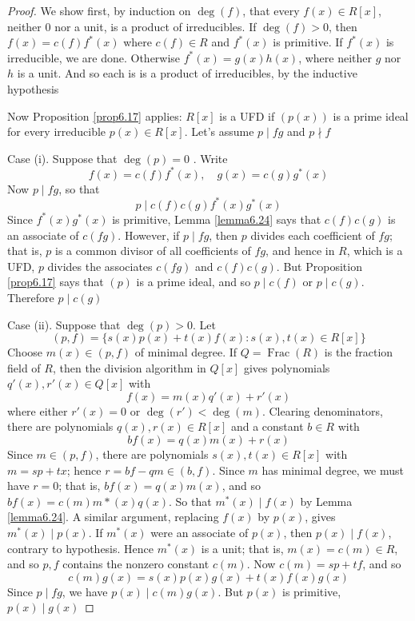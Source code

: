 \documentclass[11pt]{article}
\DeclareMathOperator{\Frac}{Frac}
\begin{document}
\begin{proof}
We show first, by induction on \(\deg(f)\), that every \(f(x)\in R[x]\),
neither 0 nor a unit, is a product of irreducibles. If \(\deg(f)>0\), then 
\(f(x)=c(f)f^*(x)\) where \(c(f)\in R\) and \(f^*(x)\) is primitive. If
\(f^*(x)\) is irreducible, we are done. Otherwise \(f^*(x)=g(x)h(x)\), where
neither \(g\) nor \(h\) is a unit. And so each is is a product of irreducibles,
by the inductive hypothesis

Now Proposition \ref{prop6.17} applies: \(R[x]\) is a UFD if \((p(x))\) is a
prime ideal for every irreducible \(p(x)\in R[x]\). Let's assume 
\(p\mid fg\) and \(p\nmid f\)

Case (i). Suppose that \(\deg(p)=0\) . Write
\begin{equation*}
f(x)=c(f)f^*(x),\quad g(x)=c(g)g^*(x)
\end{equation*}
Now \(p\mid fg\), so that
\begin{equation*}
p\mid c(f)c(g)f^*(x)g^*(x)
\end{equation*}
Since \(f^*(x)g^*(x)\) is primitive, Lemma \ref{lemma6.24} says that
\(c(f)c(g)\) is an associate of \(c(fg)\). However, if \(p\mid fg\), then \(p\)
divides each coefficient of \(fg\); that is, \(p\) is a common divisor of all
coefficients of \(fg\), and hence in \(R\), which is a UFD, \(p\) divides the
associates \(c(fg)\) and \(c(f)c(g)\). But Proposition \ref{prop6.17} says that
\((p)\) is a prime ideal, and so \(p\mid c(f)\) or \(p\mid c(g)\). Therefore
\(p\mid c(g)\)

Case (ii). Suppose that \(\deg(p)>0\). Let 
\begin{equation*}
(p,f)=\{s(x)p(x)+t(x)f(x):s(x),t(x)\in R[x]\}
\end{equation*}
Choose \(m(x)\in(p,f)\) of minimal degree. If \(Q=\Frac(R)\) is the fraction
field of \(R\), then the division algorithm in \(Q[x]\) gives polynomials
\(q'(x),r'(x)\in Q[x]\) with
\begin{equation*}
f(x)=m(x)q'(x)+r'(x)
\end{equation*}
where either \(r'(x)=0\) or \(\deg(r')<\deg(m)\). Clearing denominators,
there are polynomials \(q(x),r(x)\in R[x]\) and a constant \(b\in R\) with
\begin{equation*}
bf(x)=q(x)m(x)+r(x)
\end{equation*}
Since \(m\in(p,f)\), there are polynomials \(s(x),t(x)\in R[x]\) with 
\(m=sp+tx\); hence \(r=bf-qm\in(b,f)\). Since \(m\) has minimal degree, we
must have \(r=0\); that is, \(bf(x)=q(x)m(x)\), and so
\(bf(x)=c(m)m*(x)q(x)\). So that \(m^*(x)\mid f(x)\) by Lemma \ref{lemma6.24}.
A similar argument, replacing \(f(x)\) by \(p(x)\), gives 
\(m^*(x)\mid p(x)\). If \(m^*(x)\) were an associate of \(p(x)\), then
\(p(x)\mid f(x)\), contrary to hypothesis. Hence \(m^*(x)\) is a unit; that
is, \(m(x)=c(m)\in R\), and so \(p,f\) contains the nonzero constant
\(c(m)\). Now \(c(m)=sp+tf\), and so
\begin{equation*}
c(m)g(x)=s(x)p(x)g(x)+t(x)f(x)g(x)
\end{equation*}
Since \(p\mid fg\), we have \(p(x)\mid c(m)g(x)\). But \(p(x)\) is primitive, 
\(p(x)\mid g(x)\)
\end{proof}
\end{document}
